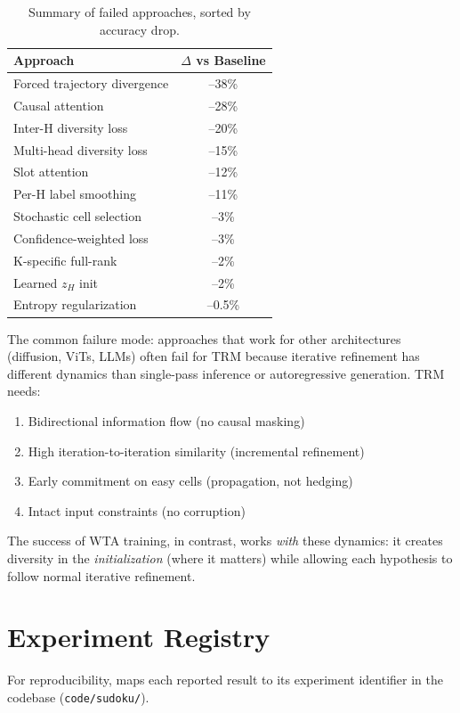 \begin{table}[h]
\centering
\small
\begin{tabular}{lc}
\toprule
Approach & $\Delta$ vs Baseline \\
\midrule
Forced trajectory divergence & --38\% \\
Causal attention & --28\% \\
Inter-H diversity loss & --20\% \\
Multi-head diversity loss & --15\% \\
Slot attention & --12\% \\
Per-H label smoothing & --11\% \\
Stochastic cell selection & --3\% \\
Confidence-weighted loss & --3\% \\
K-specific full-rank & --2\% \\
Learned $z_H$ init & --2\% \\
Entropy regularization & --0.5\% \\
\bottomrule
\end{tabular}
\caption{Summary of failed approaches, sorted by accuracy drop.}
\label{tab:failed}
\end{table}

The common failure mode: approaches that work for other architectures
(diffusion, ViTs, LLMs) often fail for TRM because iterative refinement has
different dynamics than single-pass inference or autoregressive generation.
TRM needs:
\begin{enumerate}
  \item Bidirectional information flow (no causal masking)
  \item High iteration-to-iteration similarity (incremental refinement)
  \item Early commitment on easy cells (propagation, not hedging)
  \item Intact input constraints (no corruption)
\end{enumerate}

The success of WTA training, in contrast, works \emph{with} these dynamics:
it creates diversity in the \emph{initialization} (where it matters) while
allowing each hypothesis to follow normal iterative refinement.

\section{Experiment Registry}
\label{app:experiments}

For reproducibility,  maps each reported result
to its experiment identifier in the codebase
(\texttt{code/sudoku/}).

